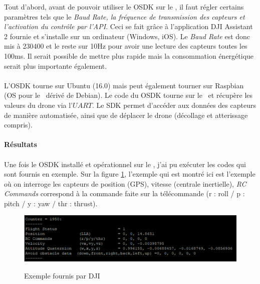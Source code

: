             Tout d'abord, avant de pouvoir utiliser le OSDK sur le \rpi, il faut régler certains paramètres tels que le \textit{Baud Rate, la fréquence de transmission des capteurs et l'activation du contrôle par l'API}. Ceci se fait grâce à l'application DJI Assistant 2 fournie et s'installe sur un ordinateur (Windows, iOS). Le \textit{Baud Rate} est donc mis à 230400 et le reste sur 10Hz pour avoir une lecture des capteurs toutes les 100ms. Il serait possible de mettre plus rapide mais la consommation énergétique serait plus importante également.
            
            \paragraph*{}
            L'OSDK tourne sur Ubuntu (16.0) mais peut également tourner sur Raspbian (OS pour le \rpi ~dérivé de Debian). Le code du OSDK tourne sur le \rpi ~et récupère les valeurs du drone via l'$UART$. Le SDK permet d'accéder aux données des capteurs de manière automatisée, ainsi que de déplacer le drone (décollage et atterissage compris).
        
        \paragraph{Résultats}
            \paragraph*{}
            Une fois le OSDK installé et opérationnel sur le \rpi, j'ai pu exécuter les codes qui sont fournis en exemple. Sur la figure \ref{fig:exTelemetry}, l'exemple qui est montré ici est l'exemple où on interroge les capteurs de position (GPS), vitesse (centrale inertielle), \textit{RC Commands} correspond à la commande faite sur la télécommande (r : roll / p : pitch / y : yaw / thr : thrust).
        
            \begin{figure}[H]
                \centering
            	\begin{frame}{\includegraphics[width=1\textwidth]{image/telemetry.png}}
            	\end{frame}
            	\caption{\label{fig:exTelemetry}Exemple fournis par DJI}
            \end{figure}
        
